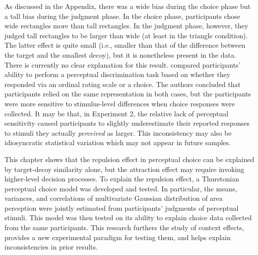 As discussed in the Appendix, there was a wide bias during the choice phase but a tall bias during the judgment phase. In the choice phase, participants chose wide rectangles more than tall rectangles. In the judgment phase, however, they judged tall rectangles to be larger than wide (at least in the triangle condition). The latter effect is quite small (i.e., smaller than that of the difference between the target and the smallest decoy), but it is nonetheless present in the data. There is currently no clear explanation for this result. \textcite{gronau2023choice} compared participants' ability to perform a perceptual discrimination task based on whether they responded via an ordinal rating scale or a choice. The authors concluded that participants relied on the same representation in both cases, but the participants were more sensitive to stimulus-level differences when choice responses were collected. It may be that, in Experiment 2, the relative lack of perceptual sensitivity caused participants to slightly underestimate their reported responses to stimuli they actually \textit{perceived} as larger. This inconsistency may also be idiosyncratic statistical variation which may not appear in future samples. 

This chapter shows that the repulsion effect in perceptual choice can be explained by target-decoy similarity alone, but the attraction effect may require invoking higher-level decision processes. To explain the repulsion effect, a Thurstonian perceptual choice model was developed and tested. In particular, the means, variances, and correlations of multivariate Gaussian distribution of area perception were jointly estimated from participants' judgments of perceptual stimuli. This model was then tested on its ability to explain choice data collected from the same participants. This research furthers the study of context effects, provides a new experimental paradigm for testing them, and helps explain inconsistencies in prior results.
